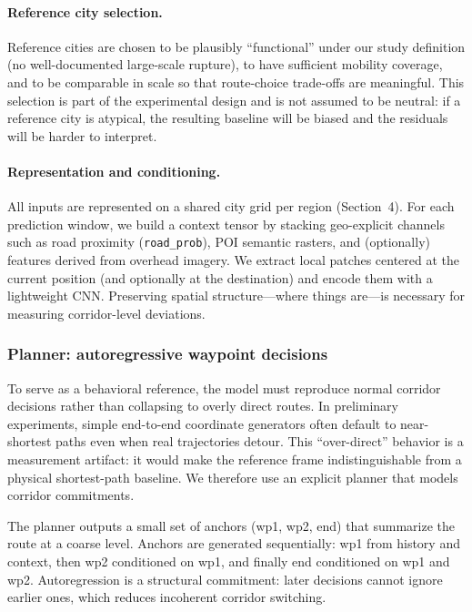 \paragraph{Reference city selection.}
Reference cities are chosen to be plausibly ``functional'' under our study definition (no well-documented large-scale rupture), to have sufficient mobility coverage, and to be comparable in scale so that route-choice trade-offs are meaningful. This selection is part of the experimental design and is not assumed to be neutral: if a reference city is atypical, the resulting baseline will be biased and the residuals will be harder to interpret.

\paragraph{Representation and conditioning.}
All inputs are represented on a shared city grid per region (Section~4). For each prediction window, we build a context tensor by stacking geo-explicit channels such as road proximity (\texttt{road\_prob}), POI semantic rasters, and (optionally) features derived from overhead imagery. We extract local patches centered at the current position (and optionally at the destination) and encode them with a lightweight CNN. Preserving spatial structure---where things are---is necessary for measuring corridor-level deviations.

\subsubsection{Planner: autoregressive waypoint decisions}
To serve as a behavioral reference, the model must reproduce normal corridor decisions rather than collapsing to overly direct routes. In preliminary experiments, simple end-to-end coordinate generators often default to near-shortest paths even when real trajectories detour. This ``over-direct'' behavior is a measurement artifact: it would make the reference frame indistinguishable from a physical shortest-path baseline. We therefore use an explicit planner that models corridor commitments.

The planner outputs a small set of anchors (wp1, wp2, end) that summarize the route at a coarse level. Anchors are generated sequentially: wp1 from history and context, then wp2 conditioned on wp1, and finally end conditioned on wp1 and wp2. Autoregression is a structural commitment: later decisions cannot ignore earlier ones, which reduces incoherent corridor switching.

